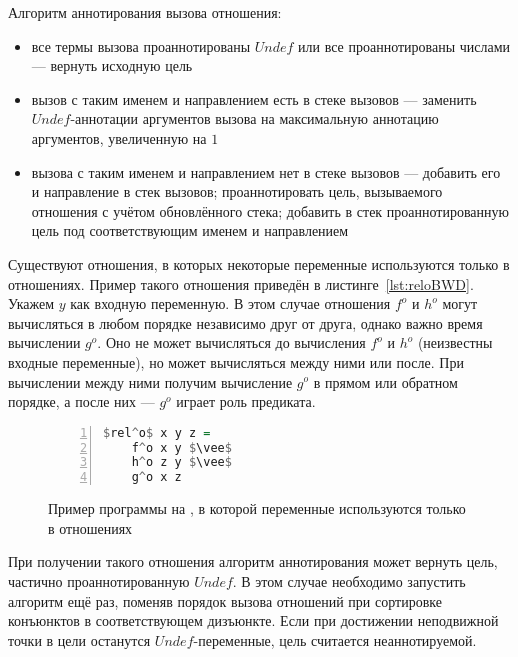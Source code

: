 \documentclass[conference,american,russian]{IEEEtran}
\begin{document}
Алгоритм аннотирования вызова отношения:
\begin{itemize}
    \item все термы вызова проаннотированы $Undef$ или все проаннотированы числами --- вернуть исходную цель
    \item вызов с таким именем и направлением есть в стеке вызовов --- заменить $Undef$-аннотации аргументов вызова на максимальную аннотацию аргументов, увеличенную на $1$
    \item вызова с таким именем и направлением нет в стеке вызовов --- добавить его и направление в стек вызовов; проаннотировать цель, вызываемого отношения с учётом обновлённого стека; добавить в стек проаннотированную цель под соответствующим именем и направлением
\end{itemize}

Существуют отношения, в которых некоторые переменные используются только в отношениях.
Пример такого отношения приведён в листинге~\ref{lst:reloBWD}.
Укажем $y$ как входную переменную.
В этом случае отношения $f^o$ и $h^o$ могут вычисляться в любом порядке независимо друг от друга, однако важно время вычислении $g^o$.
Оно не может вычисляться до вычисления $f^o$ и $h^o$ (неизвестны входные переменные), но может вычисляться между ними или после.
При вычислении между ними получим вычисление $g^o$ в прямом или обратном порядке, а после них --- $g^o$ играет роль предиката.

\begin{figure}[h!]
  \begin{center}
  \begin{minipage}{0.2\textwidth}
  \begin{lstlisting}[language=Haskell, frame=single, numbers=left,numberstyle=\small, escapechar=|]
  $rel^o$ x y z =
    f^o x y $\vee$
    h^o z y $\vee$
    g^o x z
    \end{lstlisting}
  \end{minipage}
  \end{center}
  \caption{Пример программы на \miniKanren{}, в которой переменные используются только в отношениях}
  \label{lst:reloDEF}
\end{figure}

При получении такого отношения алгоритм аннотирования может вернуть цель, частично проаннотированную  $Undef$.
В этом случае необходимо запустить алгоритм ещё раз, поменяв порядок вызова отношений при сортировке конъюнктов в соответствующем дизъюнкте.
Если при достижении неподвижной точки в цели останутся $Undef$-переменные, цель считается неаннотируемой.
\end{document}
